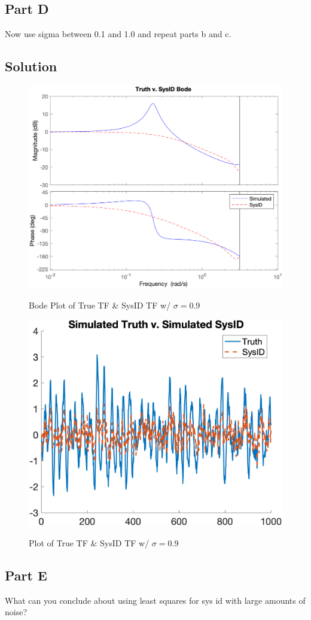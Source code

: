 \documentclass{article}
\begin{document}
\subsection*{Part D}
Now use sigma between 0.1 and 1.0 and repeat parts b and c.
\subsection*{Solution}
\begin{figure}[H]
    \centering
    \includegraphics[width=0.75\linewidth]{../figures/p4d_bode.png}\label{fig:p4d_bode}
    \caption{Bode Plot of True TF \& SysID TF w/ $\sigma=0.9$}
\end{figure}
\begin{figure}[H]
    \centering
    \includegraphics[width=0.75\linewidth]{../figures/p4d_tf.png}\label{fig:p4d_tf}
    \caption{Plot of True TF \& SysID TF w/ $\sigma=0.9$}
\end{figure}

\subsection*{Part E}
What can you conclude about using least squares for sys id with large amounts of noise?
\end{document}
